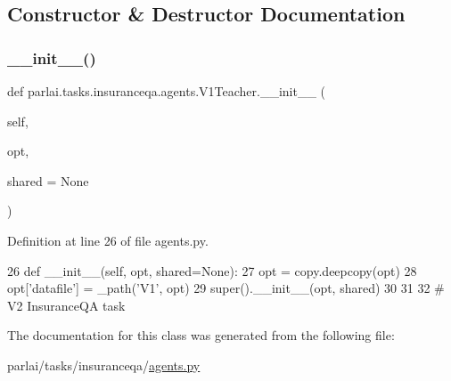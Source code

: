 \subsection{Constructor \& Destructor Documentation}
\mbox{\label{classparlai_1_1tasks_1_1insuranceqa_1_1agents_1_1V1Teacher_aa41a7ca1c1c437a0d1bb4bf93549446a}} 
\subsubsection{\texorpdfstring{\+\_\+\+\_\+init\+\_\+\+\_\+()}{\_\_init\_\_()}}
{\footnotesize\ttfamily def parlai.\+tasks.\+insuranceqa.\+agents.\+V1\+Teacher.\+\_\+\+\_\+init\+\_\+\+\_\+ (\begin{DoxyParamCaption}\item[{}]{self,  }\item[{}]{opt,  }\item[{}]{shared = {\ttfamily None} }\end{DoxyParamCaption})}



Definition at line 26 of file agents.\+py.


\begin{DoxyCode}
26     \textcolor{keyword}{def }\_\_init\_\_(self, opt, shared=None):
27         opt = copy.deepcopy(opt)
28         opt[\textcolor{stringliteral}{'datafile'}] = \_path(\textcolor{stringliteral}{'V1'}, opt)
29         super().\_\_init\_\_(opt, shared)
30 
31 
32 \textcolor{comment}{# V2 InsuranceQA task}
\end{DoxyCode}


The documentation for this class was generated from the following file\+:\begin{DoxyCompactItemize}
\item 
parlai/tasks/insuranceqa/\hyperlink{parlai_2tasks_2insuranceqa_2agents_8py}{agents.\+py}\end{DoxyCompactItemize}
